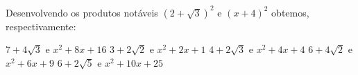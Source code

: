 Desenvolvendo os produtos notáveis $(2+\sqrt{3})^2$ e $(x+4)^2$ obtemos, respectivamente:

$7+4\sqrt{3}$ e $x^2+8x+16$
$3+2\sqrt{2}$ e $x^2+2x+1$
$4+2\sqrt{3}$ e $x^2+4x+4$
$6+4\sqrt{2}$ e $x^2+6x+9$
$6+2\sqrt{5}$ e $x^2+10x+25$


